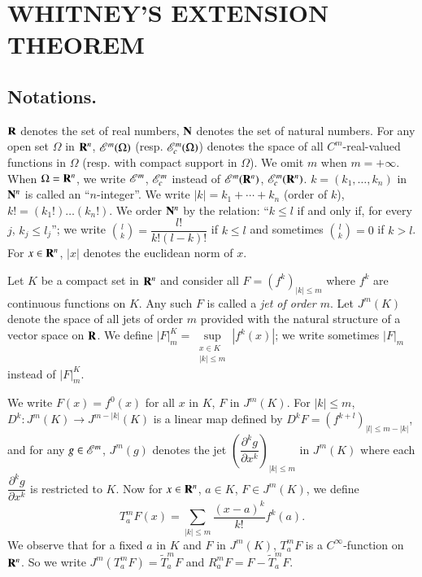 \chapter{WHITNEY'S EXTENSION THEOREM}\label{chap1}
\pageoriginale
\section[Notations]{Notations.}\label{chap1-sec1}

$\mathbf{R}$ denotes the set of real numbers, $\mathbf{N}$ denotes the set of natural numbers. For any open set $\Omega$ in $\mathbf{R}^{n}$, $\mathscr{E}^{m}(\Omega)$ (resp. $\mathscr{E}^{m}_{c}(\Omega)$) denotes the space of all $C^{m}$-real-valued functions in $\Omega$ (resp. with compact support in $\Omega$). We omit $m$ when $m=+\infty$. When $\Omega=\mathbf{R}^{n}$, we write $\mathscr{E}^{m}$, $\mathscr{E}^{m}_{c}$ instead of $\mathscr{E}^{m}(\mathbf{R}^{n})$, $\mathscr{E}^{m}_{c}(\mathbf{R}^{n})$. $k=(k_{1},\ldots,k_{n})$ in $\mathbf{N}^{n}$ is called an ``$n$-integer''. We write $|k|=k_{1}+\cdots+k_{n}$ (order of $k$), $k!=(k_{1}!)\ldots(k_{n}!)$. We order $\mathbf{N}^{n}$ by the relation: ``$k\leq l$ if and only if, for every $j$, $k_{j}\leq l_{j}$''; we write $\binom{l}{k}=\dfrac{l!}{k!(l-k)!}$ if $k\leq l$ and sometimes $\binom{l}{k}=0$ if $k>l$. For $x\in \mathbf{R}^{n}$, $|x|$ denotes the euclidean norm of $x$.

Let $K$ be a compact set in $\mathbf{R}^{n}$ and consider all $F=(f^{k})_{|k|\leq m}$ where $f^{k}$ are continuous functions on $K$. Any such $F$ is called a {\em jet of order $m$}. Let $J^{m}(K)$ denote the space of all jets of order $m$ provided with the natural structure of a vector space on $\mathbf{R}$. We define $|F|^{K}_{m}=\sup\limits_{\substack{x\in K\\ |k|\leq m}}|f^{k}(x)|$; we write sometimes $|F|_{m}$ instead of $|F|^{K}_{m}$.

We write $F(x)=f^{0}(x)$ for all $x$ in $K$, $F$ in $J^{m}(K)$. For $|k|\leq m$, $D^{k}:J^{m}(K)\to J^{m-|k|}(K)$ is a linear map defined by $D^{k}F=(f^{k+l})_{|l|\leq m-|k|}$, and for any $g\in \mathscr{E}^{m}$, $J^{m}(g)$ denotes the jet $\left(\dfrac{\partial^{k}g}{\partial x^{k}}\right)_{|k|\leq m}$ in $J^{m}(K)$ where each $\dfrac{\partial^{k}g}{\partial x^{k}}$ is restricted to $K$. Now for $x\in \mathbf{R}^{n}$, $a\in K$, $F\in J^{m}(K)$, we define
$$
T^{m}_{a}F(x)=\sum\limits_{|k|\leq m}\dfrac{(x-a)^{k}}{k!}f^{k}(a).
$$
We observe that for a fixed $a$ in $K$ and $F$ in $J^{m}(K)$, $T^{m}_{a}F$ is a $C^{\infty}$-function on $\mathbf{R}^{n}$. So we write $J^{m}(T^{m}_{a}F)=\widetilde{T}^{m}_{a}F$ and $R^{m}_{a}F=F-\widetilde{T}^{m}_{a}F$.

